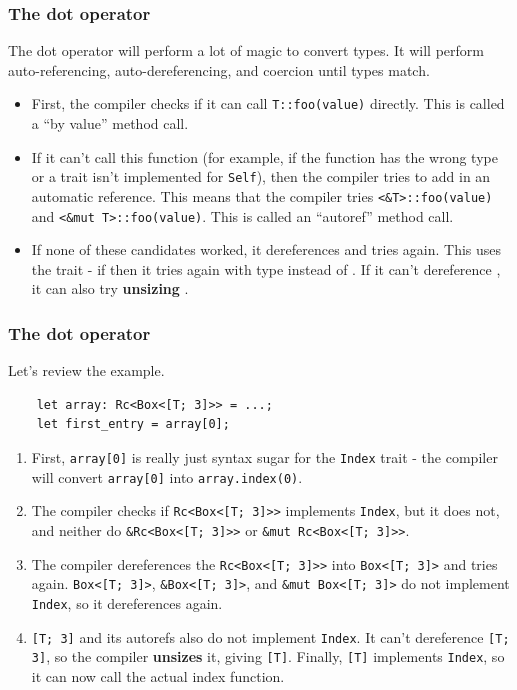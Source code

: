 \documentclass[aspectratio=1610,t]{beamer}
\begin{document}
\begin{frame}[fragile]
\frametitle{The dot operator}
The dot operator will perform a lot of magic to convert types. It will perform auto-referencing, auto-dereferencing, and coercion until types match.

\begin{itemize}
    \item<2-> First, the compiler checks if it can call \texttt{T::foo(value)} directly. This is called a ``by value'' method call.
    \item<3-> If it can't call this function (for example, if the function has the wrong type or a trait isn't implemented for \texttt{Self}), then the compiler tries to add in an automatic reference. This means that the compiler tries \texttt{<\&T>::foo(value)} and \texttt{<\&mut T>::foo(value)}. This is called an ``autoref'' method call.
    \item<4-> If none of these candidates worked, it dereferences  and tries again. This uses the  trait - if  then it tries again with type  instead of . If it can't dereference , it can also try \textbf{unsizing} .
\end{itemize}
\end{frame}


\begin{frame}[fragile]
\frametitle{The dot operator}
Let's review the example.

\begin{verbatim}
    let array: Rc<Box<[T; 3]>> = ...;
    let first_entry = array[0];
\end{verbatim}

\begin{enumerate}
    \item<2-> First, \texttt{array[0]} is really just syntax sugar for the \texttt{Index} trait - the compiler will convert \texttt{array[0]} into \texttt{array.index(0)}.
    \item<3-> The compiler checks if \texttt{Rc<Box<[T; 3]>>} implements \texttt{Index}, but it does not, and neither do \texttt{\&Rc<Box<[T; 3]>>} or \texttt{\&mut Rc<Box<[T; 3]>>}.
    \item<4-> The compiler dereferences the \texttt{Rc<Box<[T; 3]>>} into \texttt{Box<[T; 3]>} and tries again. \texttt{Box<[T; 3]>}, \texttt{\&Box<[T; 3]>}, and \texttt{\&mut Box<[T; 3]>} do not implement \texttt{Index}, so it dereferences again.
    \item<5-> \texttt{[T; 3]} and its autorefs also do not implement \texttt{Index}. It can't dereference \texttt{[T; 3]}, so the compiler \textbf{unsizes} it, giving \texttt{[T]}. Finally, \texttt{[T]} implements \texttt{Index}, so it can now call the actual index function.
\end{enumerate}
\end{frame}
\end{document}
